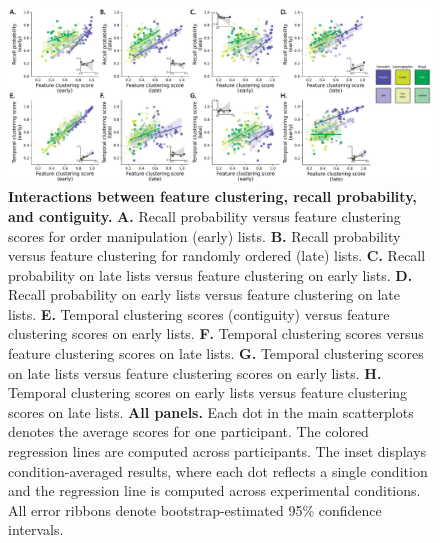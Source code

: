 \documentclass[11pt]{article}
\begin{document}
\begin{figure}[tp] \centering
    \includegraphics[width=\textwidth]{figures/feature_clustering_vs_accuracy_and_contiguity}

    \caption{\textbf{Interactions between feature clustering, recall probability,
    and contiguity.} \textbf{A.} Recall probability versus feature clustering
    scores for order manipulation (early) lists. \textbf{B.} Recall probability
    versus feature clustering for randomly ordered (late) lists. \textbf{C.} Recall
    probability on late lists versus feature clustering on early lists. \textbf{D.}
    Recall probability on early lists versus feature clustering on late lists.
    \textbf{E.} Temporal clustering scores (contiguity) versus feature clustering
    scores on early lists. \textbf{F.} Temporal clustering scores versus feature
    clustering scores on late lists. \textbf{G.} Temporal clustering scores on late
    lists versus feature clustering scores on early lists. \textbf{H.} Temporal
    clustering scores on early lists versus feature clustering scores on late
    lists. \textbf{All panels.} Each dot in the main scatterplots denotes the
    average scores for one participant. The colored regression lines are computed
    across participants. The inset displays condition-averaged results, where each
    dot reflects a single condition and the regression line is computed across
    experimental conditions. All error ribbons denote bootstrap-estimated 95\%
    confidence intervals.} \label{fig:clustering-scatterplots}

\end{figure}
\end{document}
